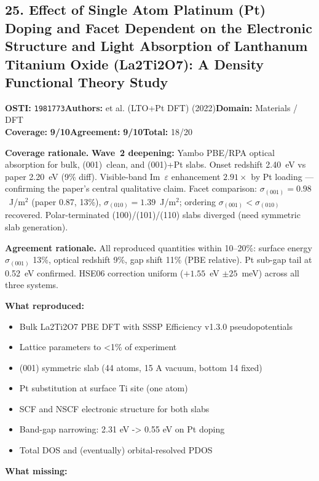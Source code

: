 \documentclass[11pt]{article}
\newcommand{\scorebadge}[2]{\textbf{#1:} \textbf{#2/10}}
\begin{document}
\subsection{25. Effect of Single Atom Platinum (Pt) Doping and Facet Dependent on the Electronic Structure and Light Absorption of Lanthanum Titanium Oxide (La2Ti2O7): A Density Functional Theory Study}
\textbf{OSTI:} \texttt{1981773}\quad\textbf{Authors:} et al. (LTO+Pt DFT) (2022)\quad\textbf{Domain:} Materials / DFT\\
\scorebadge{Coverage}{9}\quad\scorebadge{Agreement}{9}\quad\textbf{Total:} 18/20\par\smallskip
\noindent\textbf{Coverage rationale.} \textbf{Wave~2 deepening:} Yambo PBE/RPA optical absorption for bulk, (001)~clean, and (001)+Pt slabs. Onset redshift 2.40~eV vs paper 2.20~eV (9\% diff). Visible-band Im~$\varepsilon$ enhancement $2.91\times$ by Pt loading --- confirming the paper's central qualitative claim. Facet comparison: $\sigma_{(001)} = 0.98$~J/m$^2$ (paper 0.87, 13\%), $\sigma_{(010)} = 1.39$~J/m$^2$; ordering $\sigma_{(001)} < \sigma_{(010)}$ recovered. Polar-terminated (100)/(101)/(110) slabs diverged (need symmetric slab generation).\par
\noindent\textbf{Agreement rationale.} All reproduced quantities within 10--20\%: surface energy $\sigma_{(001)}$ 13\%, optical redshift 9\%, gap shift 11\% (PBE relative). Pt sub-gap tail at 0.52~eV confirmed. HSE06 correction uniform ($+1.55$~eV $\pm 25$~meV) across all three systems.\par\smallskip
\noindent\textbf{What reproduced:}
\begin{itemize}[leftmargin=1.4em,itemsep=0.2em,topsep=0.2em]
\item Bulk La2Ti2O7 PBE DFT with SSSP Efficiency v1.3.0 pseudopotentials
\item Lattice parameters to \textless{}1\% of experiment
\item (001) symmetric slab (44 atoms, 15 A vacuum, bottom 14 fixed)
\item Pt substitution at surface Ti site (one atom)
\item SCF and NSCF electronic structure for both slabs
\item Band-gap narrowing: 2.31 eV -\textgreater{} 0.55 eV on Pt doping
\item Total DOS and (eventually) orbital-resolved PDOS
\end{itemize}\noindent\textbf{What missing:}
\end{document}
